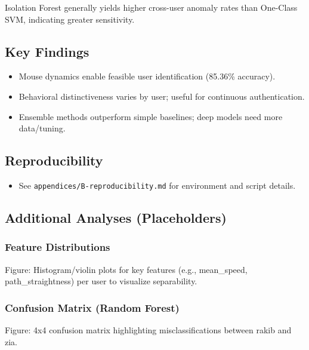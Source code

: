 \documentclass[
  11pt,
  a4paper,
]{article}
\providecommand{\tightlist}{%
  \setlength{\itemsep}{0pt}\setlength{\parskip}{0pt}}
\begin{document}
Isolation Forest generally yields higher cross-user anomaly rates than
One-Class SVM, indicating greater sensitivity.

\subsection{Key Findings}\label{key-findings}

\begin{itemize}
\tightlist
\item
  Mouse dynamics enable feasible user identification (85.36\% accuracy).
\item
  Behavioral distinctiveness varies by user; useful for continuous
  authentication.
\item
  Ensemble methods outperform simple baselines; deep models need more
  data/tuning.
\end{itemize}

\subsection{Reproducibility}\label{reproducibility}

\begin{itemize}
\tightlist
\item
  See \texttt{appendices/B-reproducibility.md} for environment and
  script details.
\end{itemize}

\subsection{Additional Analyses
(Placeholders)}\label{additional-analyses-placeholders}

\subsubsection{Feature Distributions}\label{feature-distributions}

Figure: Histogram/violin plots for key features (e.g., mean\_speed,
path\_straightness) per user to visualize separability.

\subsubsection{Confusion Matrix (Random
Forest)}\label{confusion-matrix-random-forest}

Figure: 4x4 confusion matrix highlighting misclassifications between
rakib and zia.
\end{document}
